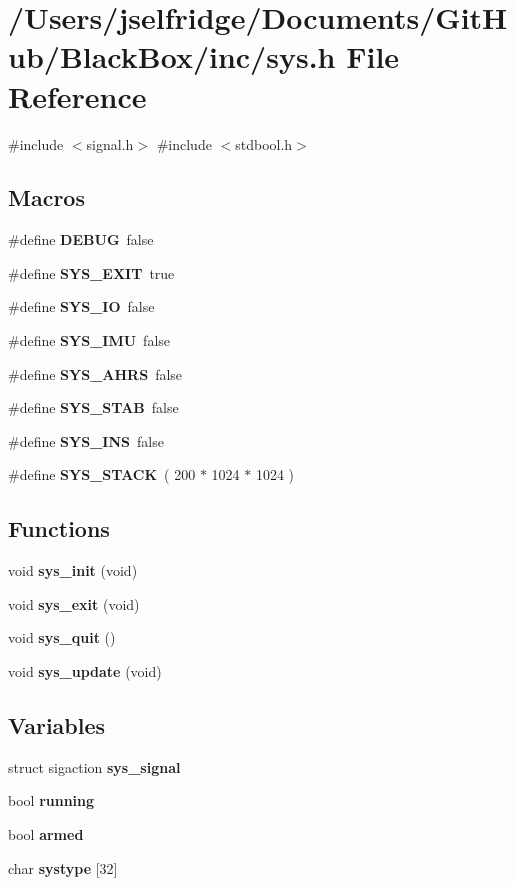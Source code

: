 \section{/\+Users/jselfridge/\+Documents/\+Git\+Hub/\+Black\+Box/inc/sys.h File Reference}
\label{sys_8h}
{\ttfamily \#include $<$signal.\+h$>$}\newline
{\ttfamily \#include $<$stdbool.\+h$>$}\newline
\subsection*{Macros}
\begin{DoxyCompactItemize}
\item 
\#define \textbf{ D\+E\+B\+UG}~false
\item 
\#define \textbf{ S\+Y\+S\+\_\+\+E\+X\+IT}~true
\item 
\#define \textbf{ S\+Y\+S\+\_\+\+IO}~false
\item 
\#define \textbf{ S\+Y\+S\+\_\+\+I\+MU}~false
\item 
\#define \textbf{ S\+Y\+S\+\_\+\+A\+H\+RS}~false
\item 
\#define \textbf{ S\+Y\+S\+\_\+\+S\+T\+AB}~false
\item 
\#define \textbf{ S\+Y\+S\+\_\+\+I\+NS}~false
\item 
\#define \textbf{ S\+Y\+S\+\_\+\+S\+T\+A\+CK}~( 200 $\ast$ 1024 $\ast$ 1024 )
\end{DoxyCompactItemize}
\subsection*{Functions}
\begin{DoxyCompactItemize}
\item 
void \textbf{ sys\+\_\+init} (void)
\item 
void \textbf{ sys\+\_\+exit} (void)
\item 
void \textbf{ sys\+\_\+quit} ()
\item 
void \textbf{ sys\+\_\+update} (void)
\end{DoxyCompactItemize}
\subsection*{Variables}
\begin{DoxyCompactItemize}
\item 
struct sigaction \textbf{ sys\+\_\+signal}
\item 
bool \textbf{ running}
\item 
bool \textbf{ armed}
\item 
char \textbf{ systype} [32]
\end{DoxyCompactItemize}


